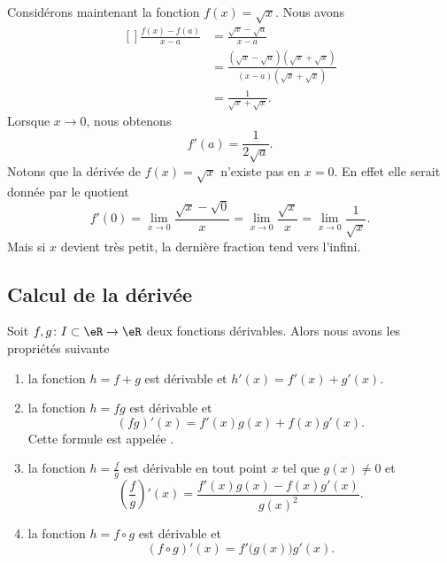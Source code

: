 Considérons maintenant la fonction $f(x)=\sqrt{x}$. Nous avons
\begin{equation}
	\begin{aligned}[]
		\frac{ f(x)-f(a) }{ x-a }&=\frac{ \sqrt{x}-\sqrt{a} }{ x-a }\\
		&=\frac{ (\sqrt{x}-\sqrt{a})(\sqrt{x}+\sqrt{x}) }{ (x-a)(\sqrt{x}+\sqrt{x}) }\\
		&=\frac{1}{ \sqrt{x}+\sqrt{x} }.
	\end{aligned}
\end{equation}
Lorsque $x\to 0$, nous obtenons
\begin{equation}
	f'(a)=\frac{1}{ 2\sqrt{a} }.
\end{equation}
Notons que la dérivée de $f(x)=\sqrt{x}$ n'existe pas en $x=0$. En effet elle serait donnée par le quotient
\begin{equation}
	f'(0)=\lim_{x\to 0} \frac{ \sqrt{x}-\sqrt{0} }{ x }=\lim_{x\to 0} \frac{ \sqrt{x} }{ x }=\lim_{x\to 0} \frac{1}{ \sqrt{x} }.
\end{equation}
Mais si $x$ devient très petit, la dernière fraction tend vers l'infini.

\subsection{Calcul de la dérivée}

\begin{proposition}     \label{PROPooOUZOooEcYKxn}
    Soit $f,g\colon I\subset\eR\to\eR $ deux fonctions dérivables. Alors nous avons les propriétés suivante
    \begin{enumerate}
    	\item
    		la fonction $h=f+g$ est dérivable et $h'(x)=f'(x)+g'(x)$.
    	\item
    		la fonction $h=fg$ est dérivable et 
    		\begin{equation}
    			(fg)'(x)=f'(x)g(x)+f(x)g'(x).
    		\end{equation}
    		Cette formule est appelée .
        \item       \label{ITEMooMUNQooLiKffz}
    		la fonction $h=\frac{ f }{ g }$ est dérivable en tout point $x$ tel que $g(x)\neq 0$ et 
    		\begin{equation}
    			\left( \frac{ f }{ g } \right)'(x)=\frac{ f'(x)g(x)-f(x)g'(x) }{ g(x)^2 }.
    		\end{equation}
        \item   \label{ITEMooLYZCooVUPTyh}
    		la fonction $h=f\circ g$ est dérivable et 
    		    \begin{equation}
    		    	(f\circ g)'(x)=f'\big( g(x) \big)g'(x).
    	    	\end{equation}
    \end{enumerate}
\end{proposition}


